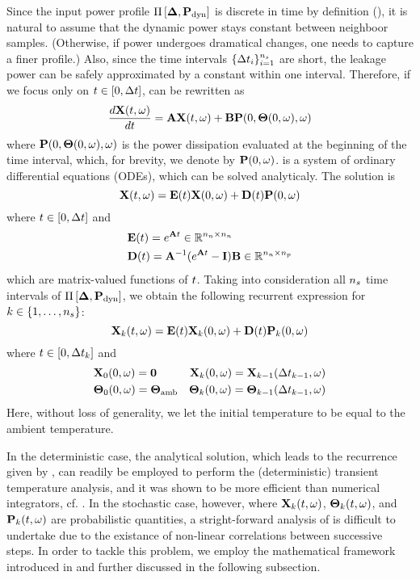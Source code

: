 Since the input power profile $\prof{\mP_\dyn}$ is discrete in time by definition (), it is natural to assume that the dynamic power stays constant between neighboor samples. (Otherwise, if power undergoes dramatical changes, one needs to capture a finer profile.) Also, since the time intervals $\{ \Delta t_i \}_{i = 1}^{{n_s}}$ are short, the leakage power can be safely approximated by a constant within one interval. Therefore, if we focus only on $t \in [0, \Delta t]$,  can be rewritten as
\begin{equation} \elabel{fourier-ode}
  \frac{d\vX(\t, \o)}{d\t} = \mA \vX(\t, \o) + \mB \vP(0, \vTO(0, \o), \o)
\end{equation}
where $\mathbf{P}(0, {\boldsymbol\Theta}(0, \omega), \omega)$ is the power dissipation evaluated at the beginning of the time interval, which, for brevity, we denote by $\mathbf{P}(0, \omega)$.  is a system of ordinary differential equations (ODEs), which can be solved analyticaly. The solution is
\begin{equation} \elabel{ode-solution}
  \vX(\t, \o) = \mE(\t) \vX(0, \o) + \mD(\t) \vP(0, \o)
\end{equation}
where $t \in [0, \Delta t]$ and
\begin{align}
  & \mE(\t) = e^{\mA \t} \in \real^{\nodes \times \nodes} \elabel{e} \\
  & \mD(\t) = \mA^{-1} (e^{\mA \t} - \mI) \mB \in \real^{\nodes \times \cores} \elabel{d}
\end{align}
which are matrix-valued functions of $t$. Taking into consideration all ${n_s}$ time intervals of $\prof{\mP_\dyn}$, we obtain the following recurrent expression for $k \in \{ 1, \dotsc, {n_s} \}$:
\begin{equation} \elabel{recurrence}
  \vX_k(\t, \o) = \mE(\t) \vX_k(0, \o) + \mD(\t) \vP_k(0, \o)
\end{equation}
where $t \in [ 0, \Delta t_k ]$ and
\begin{align*}
  & \mathbf{X}_0(0, \omega) = \mathbf{0} & \mathbf{X}_k(0, \omega) = \mathbf{X}_{k - 1}(\Delta t_{k - 1}, \omega) \\
  & {\boldsymbol\Theta}_0(0, \omega) = {\boldsymbol\Theta}_{\text{amb}} & {\boldsymbol\Theta}_k(0, \omega) = {\boldsymbol\Theta}_{k - 1}(\Delta t_{k - 1}, \omega)
\end{align*}
Here, without loss of generality, we let the initial temperature to be equal to the ambient temperature.

In the deterministic case, the analytical solution, which leads to the recurrence given by , can readily be employed to perform the (deterministic) transient temperature analysis, and it was shown to be more efficient than numerical integrators, cf. \cite{ukhov2012}. In the stochastic case, however, where $\mathbf{X}_k(t, \omega)$, ${\boldsymbol\Theta}_k(t, \omega)$, and $\mathbf{P}_k(t, \omega)$ are probabilistic quantities, a stright-forward analysis of  is difficult to undertake due to the existance of non-linear correlations between successive steps. In order to tackle this problem, we employ the mathematical framework introduced in  and further discussed in the following subsection.
